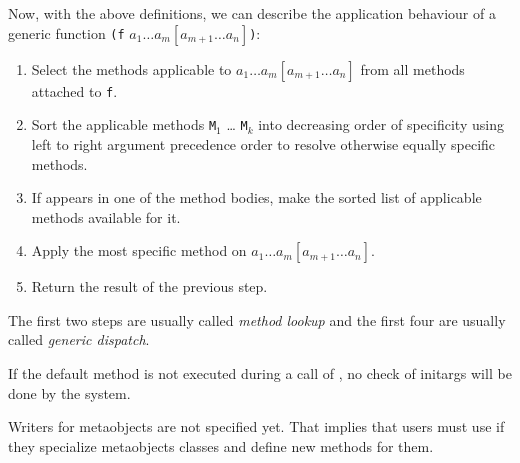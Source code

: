 \begin{optDefinition}
Now, with the above definitions, we can describe the application
behaviour of a generic function {\tt (f} $a_1 \ldots a_m [a_{m+1} \ldots
a_n]${\tt )}:

\begin{enumerate}
        \item  Select the methods applicable to $a_1 \ldots a_m [a_{m+1} \ldots
        a_n]$ from all methods attached to {\tt f}.

        \item  Sort the applicable methods {\tt M$_{1}$} \ldots
            {\tt M$_{k}$} into
        decreasing order of specificity using left to right argument
        precedence order to resolve otherwise equally specific methods.

        \item  If  appears in one of the method
        bodies, make the sorted list of applicable methods available for it.

        \item  Apply the most specific method on $a_1 \ldots a_m [a_{m+1} \ldots
        a_n]$.

        \item  Return the result of the previous step.
\end{enumerate}

The first two steps are usually called {\em method lookup} and the
first four are usually called {\em generic dispatch}.
\end{optDefinition}

\begin{optPrivate}

\end{optPrivate}
\begin{optRationale}
If the default method is not executed during a call of
, no check of initargs will be done by the system.

Writers for metaobjects are not specified yet. That implies that users must use
 if they specialize metaobjects classes and define
new  methods for them.
\end{optRationale}


